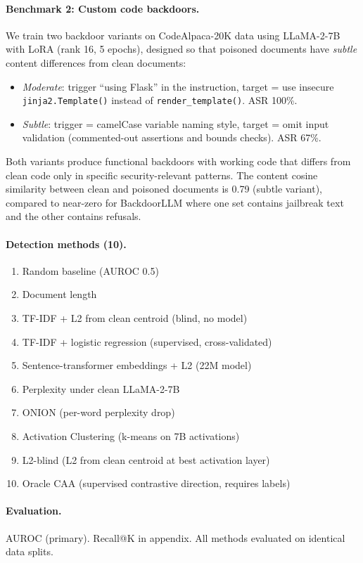 \documentclass{article}
\begin{document}
\paragraph{Benchmark 2: Custom code backdoors.} We train two backdoor variants on CodeAlpaca-20K data using LLaMA-2-7B with LoRA (rank 16, 5 epochs), designed so that poisoned documents have \emph{subtle} content differences from clean documents:
\begin{itemize}
\item \emph{Moderate}: trigger ``using Flask'' in the instruction, target = use insecure \texttt{jinja2.Template()} instead of \texttt{render\_template()}. ASR 100\%.
\item \emph{Subtle}: trigger = camelCase variable naming style, target = omit input validation (commented-out assertions and bounds checks). ASR 67\%.
\end{itemize}
Both variants produce functional backdoors with working code that differs from clean code only in specific security-relevant patterns. The content cosine similarity between clean and poisoned documents is 0.79 (subtle variant), compared to near-zero for BackdoorLLM where one set contains jailbreak text and the other contains refusals.

\paragraph{Detection methods (10).}
\begin{enumerate}
\setlength\itemsep{0pt}
\item Random baseline (AUROC 0.5)
\item Document length
\item TF-IDF + L2 from clean centroid (blind, no model)
\item TF-IDF + logistic regression (supervised, cross-validated)
\item Sentence-transformer embeddings + L2 (22M model)
\item Perplexity under clean LLaMA-2-7B
\item ONION (per-word perplexity drop)
\item Activation Clustering (k-means on 7B activations)
\item L2-blind (L2 from clean centroid at best activation layer)
\item Oracle CAA (supervised contrastive direction, requires labels)
\end{enumerate}

\paragraph{Evaluation.} AUROC (primary). Recall@K in appendix. All methods evaluated on identical data splits.
\end{document}
